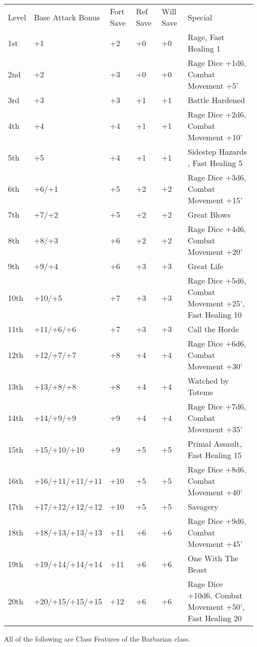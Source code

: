\begin{table}[htb]
\begin{small}
\begin{tabular}{lp{3cm}p{0.7cm}p{0.7cm}p{0.7cm}l}
Level  &Base Attack Bonus &Fort Save &Ref Save &Will Save &Special\\
1st &+1 &+2 &+0 &+0 &Rage, Fast Healing 1\\
2nd &+2 &+3 &+0 &+0 &Rage Dice +1d6, Combat Movement +5'\\
3rd &+3 &+3 &+1 &+1 &Battle Hardened\\
4th &+4 &+4 &+1 &+1 &Rage Dice +2d6, Combat Movement +10'\\
5th &+5 &+4 &+1 &+1 &Sidestep Hazards , Fast Healing 5\\
6th &+6/+1 &+5 &+2 &+2 &Rage Dice +3d6, Combat Movement +15'\\
7th &+7/+2 &+5 &+2 &+2 &Great Blows\\
8th &+8/+3 &+6 &+2 &+2 &Rage Dice +4d6, Combat Movement +20'\\
9th &+9/+4 &+6 &+3 &+3 &Great Life\\
10th &+10/+5 &+7 &+3 &+3 &Rage Dice +5d6, Combat Movement +25', Fast Healing 10\\
11th &+11/+6/+6 &+7 &+3 &+3 &Call the Horde\\
12th &+12/+7/+7 &+8 &+4 &+4 &Rage Dice +6d6, Combat Movement +30'\\
13th &+13/+8/+8 &+8 &+4 &+4 &Watched by Totems\\
14th &+14/+9/+9 &+9 &+4 &+4 &Rage Dice +7d6, Combat Movement +35'\\
15th &+15/+10/+10 &+9 &+5 &+5 &Primal Assault, Fast Healing 15\\
16th &+16/+11/+11/+11 &+10 &+5 &+5 &Rage Dice +8d6, Combat Movement +40'\\
17th &+17/+12/+12/+12 &+10 &+5 &+5 &Savagery\\
18th &+18/+13/+13/+13 &+11 &+6 &+6 &Rage Dice +9d6, Combat Movement +45'\\
19th &+19/+14/+14/+14 &+11 &+6 &+6 &One With The Beast\\
20th &+20/+15/+15/+15 &+12 &+6 &+6 &Rage Dice +10d6, Combat Movement +50', Fast Healing 20\\
\end{tabular}
\end{small}
\end{table}

\smallskip\noindent All of the following are Class Features of the Barbarian class.


